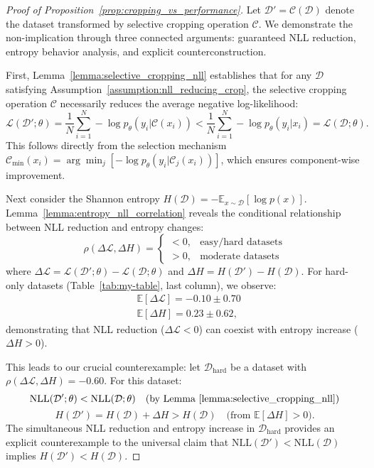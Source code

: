 \begin{proof}[Proof of Proposition~\ref{prop:cropping_vs_performance}]
Let $\mathcal{D}' = \mathcal{C}(\mathcal{D})$ denote the dataset transformed by selective cropping operation $\mathcal{C}$. We demonstrate the non-implication through three connected arguments: guaranteed NLL reduction, entropy behavior analysis, and explicit counterconstruction.

First, Lemma~\ref{lemma:selective_cropping_nll} establishes that for any $\mathcal{D}$ satisfying Assumption~\ref{assumption:nll_reducing_crop}, the selective cropping operation $\mathcal{C}$ necessarily reduces the average negative log-likelihood:
\[
\mathcal{L}(\mathcal{D}';\theta) = \frac{1}{N}\sum_{i=1}^N -\log p_\theta(y_i|\mathcal{C}(x_i)) < \frac{1}{N}\sum_{i=1}^N -\log p_\theta(y_i|x_i) = \mathcal{L}(\mathcal{D};\theta).
\]
This follows directly from the selection mechanism $\mathcal{C}_{\mathrm{min}}(x_i) = \arg\min_j [-\log p_\theta(y_i|\mathcal{C}_j(x_i))]$, which ensures component-wise improvement.

Next consider the Shannon entropy $H(\mathcal{D}) = -\mathbb{E}_{x\sim\mathcal{D}}[\log p(x)]$. Lemma~\ref{lemma:entropy_nll_correlation} reveals the conditional relationship between NLL reduction and entropy changes:
\[
\rho(\Delta\mathcal{L}, \Delta H) = 
\begin{cases} 
    < 0, & \text{easy/hard datasets} \\
    > 0, & \text{moderate datasets}
\end{cases}
\]
where $\Delta\mathcal{L} = \mathcal{L}(\mathcal{D}';\theta) - \mathcal{L}(\mathcal{D};\theta)$ and $\Delta H = H(\mathcal{D}') - H(\mathcal{D})$. For hard-only datasets (Table~\ref{tab:my-table}, last column), we observe:
\begin{align*}
&\mathbb{E}[\Delta\mathcal{L}] = -0.10 \pm 0.70 \\
&\mathbb{E}[\Delta H] = 0.23 \pm 0.62,
\end{align*}
demonstrating that NLL reduction ($\Delta\mathcal{L} < 0$) can coexist with entropy increase ($\Delta H > 0$).

This leads to our crucial counterexample: let $\mathcal{D}_{\mathrm{hard}}$ be a dataset with $\rho(\Delta\mathcal{L}, \Delta H) = -0.60$. For this dataset:
\[
\mathrm{NLL}(\mathcal{D}'; \theta) < \mathrm{NLL}(\mathcal{D}; \theta) \quad \text{(by Lemma~\ref{lemma:selective_cropping_nll})}
\]
\[
H(\mathcal{D}') = H(\mathcal{D}) + \Delta H > H(\mathcal{D}) \quad \text{(from $\mathbb{E}[\Delta H] > 0$)}.
\]
The simultaneous NLL reduction and entropy increase in $\mathcal{D}_{\mathrm{hard}}$ provides an explicit counterexample to the universal claim that $\mathrm{NLL}(\mathcal{D}') < \mathrm{NLL}(\mathcal{D})$ implies $H(\mathcal{D}') < H(\mathcal{D})$.


\end{proof}
